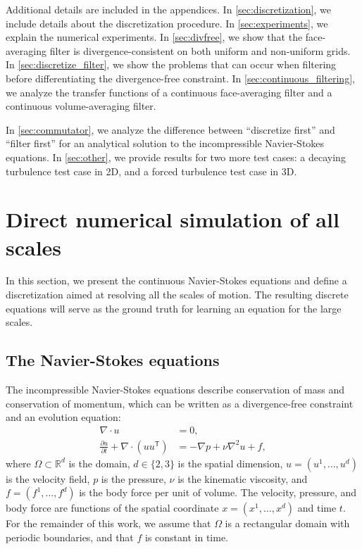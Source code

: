 \documentclass[preprint]{elsarticle}
\newcommand{\R}[1]{}
\newcommand{\revboth}[1]{#1}
\begin{document}
\revboth{
    \R{appendices}
    Additional details are included in the appendices.
    In \ref{sec:discretization}, we include details about the discretization procedure.
    In \ref{sec:experiments}, we explain the numerical experiments.
    In \ref{sec:divfree}, we show that the face-averaging filter is divergence-consistent on both uniform and non-uniform grids.
    In \ref{sec:discretize_filter}, we show the problems that can occur when filtering before differentiating the divergence-free constraint.
    In \ref{sec:continuous_filtering}, we analyze the transfer functions of a continuous face-averaging filter and a continuous volume-averaging filter.
    \R{commutator_ref}
    In \ref{sec:commutator}, we analyze the difference between ``discretize first'' and ``filter first'' for an analytical solution to the incompressible Navier-Stokes equations.
    In \ref{sec:other}, we provide results for two more test cases:
    a decaying turbulence test case in 2D, and a forced turbulence test case in 3D.
}

\section{Direct numerical simulation of all scales} \label{sec:dns}

In this section, we present the continuous Navier-Stokes equations and define a
discretization aimed at resolving all the scales of motion. The resulting
discrete equations will serve as the ground truth for learning an equation for
the large scales.

\subsection{The Navier-Stokes equations}

The incompressible Navier-Stokes equations describe conservation of mass and
conservation of momentum, which can be written as a divergence-free constraint
and an evolution equation:
\begin{align}
    \nabla \cdot u & = 0, \label{eq:mass_continuous} \\
    \frac{\partial u}{\partial t} +
    \nabla \cdot (u u^\mathsf{T}) & =
    -\nabla p +
    \nu \nabla^2 u +
    f, \label{eq:momentum_continuous}
\end{align}
where $\Omega \subset \mathbb{R}^d$ is the domain, $d \in \{2, 3\}$ is the
spatial dimension, $u = (u^1, \dots, u^d)$ is the velocity field, $p$ is the
pressure, $\nu$ is the kinematic viscosity, and $f = (f^1, \dots, f^d)$ is
the body force per unit of volume. The velocity, pressure, and body force are
functions of the spatial coordinate $x = (x^1, \dots, x^d)$ and time $t$.
For the remainder of this work, we assume that $\Omega$ is a rectangular domain
with periodic boundaries, and that $f$ is constant in time.
\end{document}
